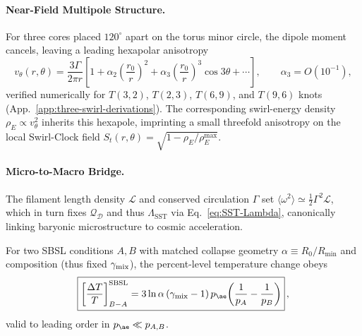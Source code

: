 \documentclass[10pt,reprint,aps,onecolumn,nofootinbib]{revtex4-2}
\begin{document}
\paragraph{Near-Field Multipole Structure.}
    For three cores placed $120^\circ$ apart on the torus minor circle, the dipole
    moment cancels, leaving a leading hexapolar anisotropy
    \begin{equation}
        \boxed{\;
        v_\theta(r,\theta)=\frac{3\Gamma}{2\pi r}\!\left[
                                                       1+\alpha_2\!\left(\frac{r_0}{r}\right)^{2}
                                                       +\alpha_3\!\left(\frac{r_0}{r}\right)^{3}\cos 3\theta+\cdots
        \right],
            \qquad
            \alpha_3=O(10^{-1}),
            \;}
        \label{eq:hexapole-expansion}
    \end{equation}
    verified numerically for $T(3,2)$, $T(2,3)$, $T(6,9)$, and $T(9,6)$ knots
    (App.~\ref{app:three-swirl-derivations}).
    The corresponding swirl-energy density $\rho_{\!E}\propto v_\theta^2$ inherits this
    hexapole, imprinting a small threefold anisotropy on the local Swirl-Clock field
    $S_t(r,\theta)=\sqrt{1-\rho_{\!E}/\rho_{\!E}^{\max}}$.

\paragraph{Micro-to-Macro Bridge.}
    The filament length density $\mathcal{L}$ and conserved circulation $\Gamma$
    set $\langle\omega^2\rangle\simeq \tfrac12\Gamma^2\mathcal{L}$, which in turn fixes
    $\mathcal{Q}_\mathcal{D}$ and thus $\Lambda_{\!\mathrm{SST}}$ via
    Eq.~\eqref{eq:SST-Lambda}, canonically linking baryonic microstructure to cosmic
    acceleration.

    \begin{corollary}
        For two SBSL conditions $A,B$ with matched collapse geometry $\alpha\equiv R_0/R_{\min}$ and composition (thus fixed $\gamma_{\rm mix}$), the percent-level temperature change obeys
        \[
            \boxed{
                \left[\frac{\Delta T}{T}\right]^{\rm SBSL}_{B-A}
                = 3\ln\alpha\,(\gamma_{\rm mix}-1)\,p_{\ae}\!\left(\frac{1}{p_A}-\frac{1}{p_B}\right)
            }\,,
        \]
        valid to leading order in $p_{\ae}\ll p_{A,B}$.
    \end{corollary}
\end{document}
